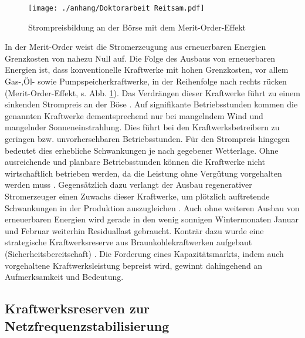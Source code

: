 		\begin{figure} [H]
			\centering
			\label{Abb. Strompreisbildung Merit Order}
			\texttt{[image: ./anhang/Doktorarbeit Reitsam.pdf]}
			\caption{Strompreisbildung an der Börse mit dem Merit-Order-Effekt \parencite{Doktorarbeit_Reitsam}}
		\end{figure}
		
		In der Merit-Order weist die Stromerzeugung aus erneuerbaren Energien Grenzkosten von nahezu Null auf.
		Die Folge des Ausbaus von erneuerbaren Energien ist, dass konventionelle Kraftwerke mit hohen Grenzkosten, vor allem Gas-,Öl- sowie Pumpspeicherkraftwerke, in der Reihenfolge nach rechts rücken (Merit-Order-Effekt, s. Abb. \ref{Abb. Strompreisbildung Merit Order}).
		Das Verdrängen dieser Kraftwerke führt zu einem sinkenden Strompreis an der Böse \parencite{Frauenhofer_PV_Bericht}.
		Auf signifikante Betriebsstunden kommen die genannten Kraftwerke dementsprechend nur bei mangelndem Wind und mangelnder Sonneneinstrahlung.
		Dies führt bei den Kraftwerksbetreibern zu geringen bzw. unvorhersehbaren Betriebsstunden. 
 		Für den Strompreis hingegen bedeutet dies erhebliche Schwankungen je nach gegebener Wetterlage.
		Ohne ausreichende und planbare Betriebsstunden können die Kraftwerke nicht wirtschaftlich betrieben werden, da die Leistung ohne Vergütung vorgehalten werden muss \parencite{Frauenhofer_PV_Bericht}.
		Gegensätzlich dazu verlangt der Ausbau regenerativer Stromerzeuger einen Zuwachs dieser Kraftwerke, um plötzlich auftretende Schwankungen in der Produktion auszugleichen \parencite{Doktorarbeit_Reitsam}.
		Auch ohne weiteren Ausbau von erneuerbaren Energien wird gerade in den wenig sonnigen Wintermonaten Januar und Februar weiterhin Residuallast gebraucht.
		Konträr dazu wurde eine strategische Kraftwerksreserve aus Braunkohlekraftwerken aufgebaut (Sicherheitsbereitschaft) \parencite{bbh_blog}.		
		Die Forderung eines Kapazitätsmarkts, indem auch vorgehaltene Kraftwerksleistung bepreist wird, gewinnt dahingehend an Aufmerksamkeit und Bedeutung.
		
	\subsection{Kraftwerksreserven zur Netzfrequenzstabilisierung}
	
